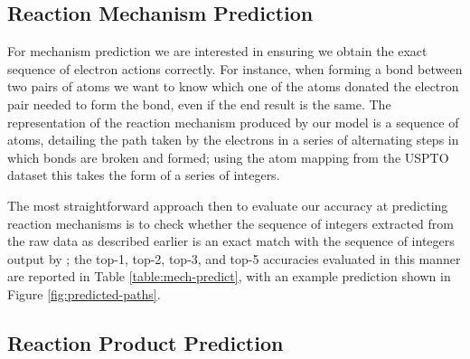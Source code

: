 \subsection{Reaction Mechanism Prediction}

For mechanism prediction we are interested in ensuring we obtain the exact sequence of electron actions correctly.
For instance, when forming a bond between two pairs of atoms we want to know which one of the atoms donated the electron pair needed to form the bond, even if the end result is the same. 
The representation of the reaction mechanism produced by our model is a sequence of atoms, detailing the path taken by the electrons in a series of alternating steps in which bonds are broken and formed; using the atom mapping from the USPTO dataset this takes the form of a series of integers.

The most straightforward approach then to evaluate our accuracy at predicting reaction mechanisms is to check whether the sequence of integers extracted from the raw data as described earlier
is an exact match with the sequence of integers output by \ourModel; the top-1, top-2, top-3, and top-5 accuracies evaluated in this manner are reported in Table \ref{table:mech-predict}, with an example prediction shown in Figure \ref{fig:predicted-paths}.



\subsection{Reaction Product Prediction}
\label{sec:product-prediction}



